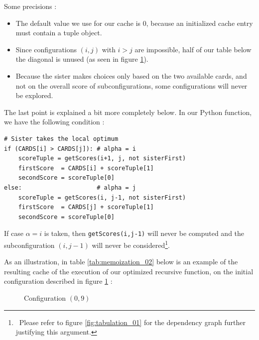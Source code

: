 \documentclass[a4paper,12pt,fleqn]{article}
\begin{document}
Some precisions :
\begin{itemize}
    \item The default value we use for our cache is 0, because an initialized cache entry must contain a tuple object.
    \item Since configurations $(i,j)$ with $i > j$ are impossible, half of our table below the diagonal is unused (as seen in figure \ref{fig:memoization_01}).
    \item Because the sister makes choices only based on the two available cards, and not on the overall score of subconfigurations, some configurations will never be explored.
\end{itemize}

The last point is explained a bit more completely below. In our Python function, we have the following condition :

\begin{verbatim}
# Sister takes the local optimum
if (CARDS[i] > CARDS[j]): # alpha = i
    scoreTuple = getScores(i+1, j, not sisterFirst)
    firstScore  = CARDS[i] + scoreTuple[1]
    secondScore = scoreTuple[0]
else:                     # alpha = j
    scoreTuple = getScores(i, j-1, not sisterFirst)
    firstScore  = CARDS[j] + scoreTuple[1]
    secondScore = scoreTuple[0]
\end{verbatim}

If case $\alpha = i$ is taken, then \texttt{getScores(i,j-1)} will never be computed and the subconfiguration $(i, j-1)$ will never be considered\footnote{\ Please refer to figure \ref{fig:tabulation_01} for the dependency graph further justifying this argument.}.

As an illustration, in table \ref{tab:memoization_02} below is an example of the resulting cache of the execution of our optimized recursive function, on the initial configuration described in figure \ref{fig:memoization_01} :

\begin{figure}[H]
    \centering
    \caption{Configuration $(0,9)$}
    \label{fig:memoization_01}
\end{figure}
\end{document}
